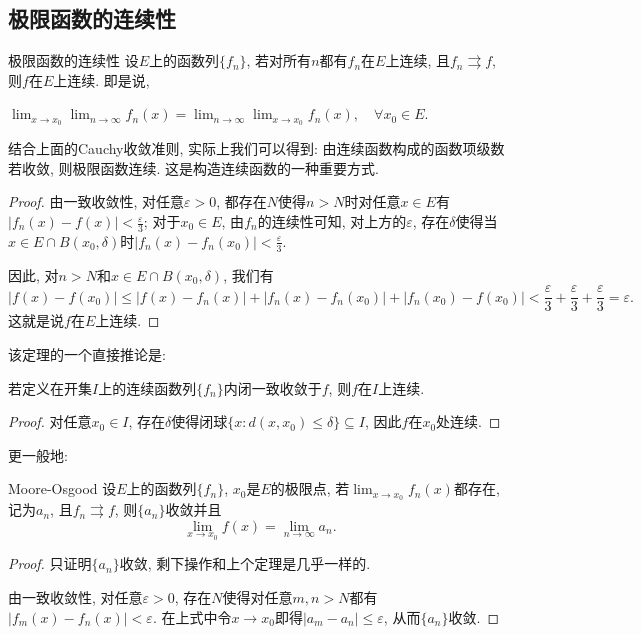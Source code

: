 \subsection{极限函数的连续性}

\begin{theorem}{极限函数的连续性} \label{jixmhjuudelmxuxk}
	设$E$上的函数列$\{ f_n \}$, 若对所有$n$都有$f_n$在$E$上连续, 且$f_n \rightrightarrows f$, 则$f$在$E$上连续. 即是说, 
	\begin{center}
		$\displaystyle \lim_{x \to x_0} \lim_{n \to \infty} f_n(x) = \lim_{n\to \infty} \lim_{x \to x_0} f_n(x) , \quad \forall x_0 \in E. $
	\end{center}
\end{theorem}
\begin{remark}
	结合上面的Cauchy收敛准则, 实际上我们可以得到: 由连续函数构成的函数项级数若收敛, 则极限函数连续. 这是构造连续函数的一种重要方式. 
\end{remark}
\begin{proof}
	由一致收敛性, 对任意$\varepsilon >0$, 都存在$N$使得$n>N$时对任意$x \in E$有$|f_n(x)-f(x)|<\frac{\varepsilon}{3}$; 对于$x_0 \in E$, 由$f_n$的连续性可知, 对上方的$\varepsilon$, 存在$\delta$使得当$x \in E \cap B(x_0,\delta)$时$|f_n(x)-f_n(x_0)|<\frac{\varepsilon}{3}$. 
	
	因此, 对$n>N$和$x \in E \cap B(x_0,\delta)$, 我们有$$|f(x)-f(x_0)| \leq |f(x)-f_n(x)|+|f_n(x)-f_n(x_0)| + |f_n(x_0)-f(x_0)| < \frac{\varepsilon}{3} + \frac{\varepsilon}{3} + \frac{\varepsilon}{3} = \varepsilon .$$
	这就是说$f$在$E$上连续. 
\end{proof}

该定理的一个直接推论是: 

\begin{corollary}{}
	若定义在开集$I$上的连续函数列$\{ f_n \}$内闭一致收敛于$f$, 则$f$在$I$上连续. 
\end{corollary}
\begin{proof}
	对任意$x_0 \in I$, 存在$\delta$使得闭球$\{ x:d(x,x_0)\leq \delta \} \subseteq I$, 因此$f$在$x_0$处连续. 
\end{proof}

更一般地: 

\begin{theorem}{Moore-Osgood}
	设$E$上的函数列$\{ f_n \}$, $x_0$是$E$的极限点, 若$\lim_{x \to x_0} f_n(x)$都存在, 记为$a_n$, 且$f_n \rightrightarrows f$, 则$\{ a_n \}$收敛并且$$\lim_{x \to x_0} f(x) = \lim_{n \to \infty} a_n.$$
\end{theorem}
\begin{proof}
	只证明$\{ a_n \}$收敛, 剩下操作和上个定理是几乎一样的. 
	
	由一致收敛性, 对任意$\varepsilon >0$, 存在$N$使得对任意$m,n >N$都有$|f_m(x)-f_n(x)|<\varepsilon$. 在上式中令$x \to x_0$即得$|a_m-a_n|\leq \varepsilon$, 从而$\{ a_n \}$收敛. 
\end{proof}

